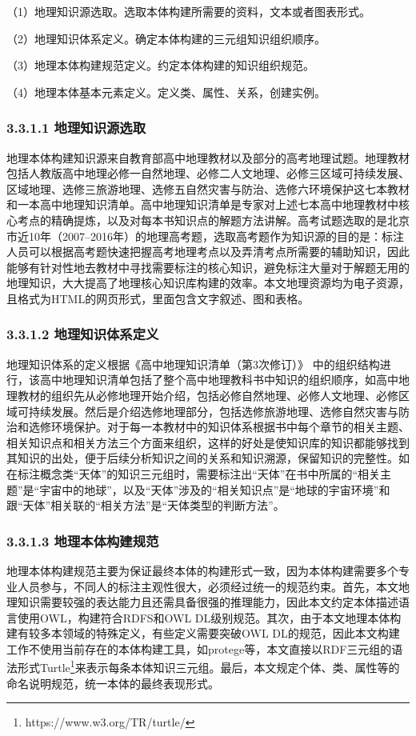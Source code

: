 （1）地理知识源选取。选取本体构建所需要的资料，文本或者图表形式。

（2）地理知识体系定义。确定本体构建的三元组知识组织顺序。

（3）地理本体构建规范定义。约定本体构建的知识组织规范。

（4）地理本体基本元素定义。定义类、属性、关系，创建实例。

\subsubsection{3.3.1.1 地理知识源选取}
地理本体构建知识源来自教育部高中地理教材以及部分的高考地理试题。地理教材包括人教版高中地理必修一自然地理、必修二人文地理、必修三区域可持续发展、区域地理、选修三旅游地理、选修五自然灾害与防治、选修六环境保护这七本教材和一本高中地理知识清单。高中地理知识清单是专家对上述七本高中地理教材中核心考点的精确提炼，以及对每本书知识点的解题方法讲解。高考试题选取的是北京市近10年（2007--2016年）的地理高考题，选取高考题作为知识源的目的是：标注人员可以根据高考题快速把握高考地理考点以及弄清考点所需要的辅助知识，因此能够有针对性地去教材中寻找需要标注的核心知识，避免标注大量对于解题无用的地理知识，大大提高了地理核心知识库构建的效率。本文地理资源均为电子资源，且格式为HTML的网页形式，里面包含文字叙述、图和表格。

\subsubsection{3.3.1.2 地理知识体系定义}
地理知识体系的定义根据《高中地理知识清单（第3次修订）》
中的组织结构进行，该高中地理知识清单包括了整个高中地理教科书中知识的组织顺序，如高中地理教材的组织先从必修地理开始介绍，包括必修自然地理、必修人文地理、必修区域可持续发展。然后是介绍选修地理部分，包括选修旅游地理、选修自然灾害与防治和选修环境保护。对于每一本教材中的知识体系根据书中每个章节的相关主题、相关知识点和相关方法三个方面来组织，这样的好处是使知识库的知识都能够找到其知识的出处，便于后续分析知识之间的关系和知识溯源，保留知识的完整性。如在标注概念类“天体”的知识三元组时，需要标注出“天体”在书中所属的“相关主题”是“宇宙中的地球”，以及“天体”涉及的“相关知识点”是“地球的宇宙环境”和跟“天体”相关联的“相关方法”是“天体类型的判断方法”。

\subsubsection{3.3.1.3 地理本体构建规范}
地理本体构建规范主要为保证最终本体的构建形式一致，因为本体构建需要多个专业人员参与，不同人的标注主观性很大，必须经过统一的规范约束。首先，本文地理知识需要较强的表达能力且还需具备很强的推理能力，因此本文约定本体描述语言使用OWL，构建符合RDFS和OWL DL级别规范。其次，由于本文地理本体构建有较多本领域的特殊定义，有些定义需要突破OWL DL的规范，因此本文构建工作不使用当前存在的本体构建工具，如protege等，本文直接以RDF三元组的语法形式Turtle\footnote{https://www.w3.org/TR/turtle/}来表示每条本体知识三元组。最后，本文规定个体、类、属性等的命名说明规范，统一本体的最终表现形式。

